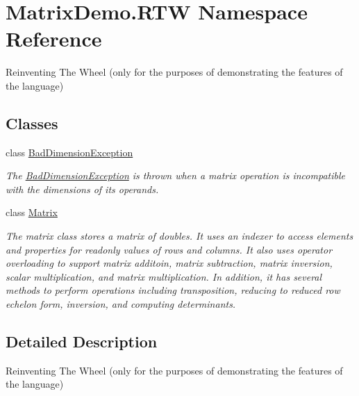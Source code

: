 \hypertarget{namespace_matrix_demo_1_1_r_t_w}{}\section{Matrix\+Demo.\+R\+TW Namespace Reference}
\label{namespace_matrix_demo_1_1_r_t_w}


Reinventing The Wheel (only for the purposes of demonstrating the features of the language)  


\subsection*{Classes}
\begin{DoxyCompactItemize}
\item 
class \mbox{\hyperlink{class_matrix_demo_1_1_r_t_w_1_1_bad_dimension_exception}{Bad\+Dimension\+Exception}}
\begin{DoxyCompactList}\small\item\em The \mbox{\hyperlink{class_matrix_demo_1_1_r_t_w_1_1_bad_dimension_exception}{Bad\+Dimension\+Exception}} is thrown when a matrix operation is incompatible with the dimensions of its operands. \end{DoxyCompactList}\item 
class \mbox{\hyperlink{class_matrix_demo_1_1_r_t_w_1_1_matrix}{Matrix}}
\begin{DoxyCompactList}\small\item\em The matrix class stores a matrix of doubles. It uses an indexer to access elements and properties for readonly values of rows and columns. It also uses operator overloading to support matrix additoin, matrix subtraction, matrix inversion, scalar multiplication, and matrix multiplication. In addition, it has several methods to perform operations including transposition, reducing to reduced row echelon form, inversion, and computing determinants. \end{DoxyCompactList}\end{DoxyCompactItemize}


\subsection{Detailed Description}
Reinventing The Wheel (only for the purposes of demonstrating the features of the language) 


